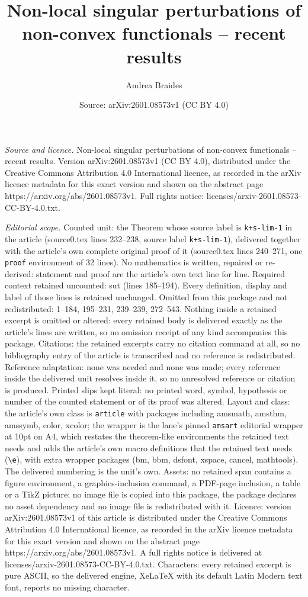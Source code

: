 \documentclass[10pt,a4paper]{amsart}
\title[Non-local singular perturbations of non-convex functionals -]{Non-local singular perturbations of non-convex functionals -- recent results}
\author{Andrea Braides}
\date{Source: arXiv:2601.08573v1 (CC BY 4.0)}
\begin{document}
\maketitle

\noindent\emph{Source and licence.} Non-local singular perturbations of non-convex functionals -- recent results. Version arXiv:2601.08573v1 (CC BY 4.0), distributed under the Creative Commons Attribution 4.0 International licence, as recorded in the arXiv licence metadata for this exact version and shown on the abstract page https://arxiv.org/abs/2601.08573v1. Full rights notice: licenses/arxiv-2601.08573-CC-BY-4.0.txt.\par\smallskip

\noindent\textit{Editorial scope.} Counted unit: the Theorem whose source label is \texttt{k+s-lim-1} in the article (source0.tex lines 232--238, source label \texttt{k+s-lim-1}), delivered together with the article's own complete original proof of it (source0.tex lines 240--271, one \texttt{proof} environment of 32 lines). No mathematics is written, repaired or re-derived: statement and proof are the article's own text line for line. Required context retained uncounted: sut (lines 185--194). Every definition, display and label of those lines is retained unchanged. Omitted from this package and not redistributed: 1--184, 195--231, 239--239, 272--543. Nothing inside a retained excerpt is omitted or altered: every retained body is delivered exactly as the article's lines are written, so no omission receipt of any kind accompanies this package. Citations: the retained excerpts carry no citation command at all, so no bibliography entry of the article is transcribed and no reference is redistributed. Reference adaptation: none was needed and none was made; every reference inside the delivered unit resolves inside it, so no unresolved reference or citation is produced. Printed slips kept literal: no printed word, symbol, hypothesis or number of the counted statement or of its proof was altered. Layout and class: the article's own class is \texttt{article} with packages including amsmath, amsthm, amssymb, color, xcolor; the wrapper is the lane's pinned \texttt{amsart} editorial wrapper at 10pt on A4, which restates the theorem-like environments the retained text needs and adds the article's own macro definitions that the retained text needs (\texttt{\textbackslash e}), with extra wrapper packages (bm, bbm, dsfont, xspace, cancel, mathtools). The delivered numbering is the unit's own. Assets: no retained span contains a figure environment, a graphics-inclusion command, a PDF-page inclusion, a table or a TikZ picture; no image file is copied into this package, the package declares no asset dependency and no image file is redistributed with it. Licence: version arXiv:2601.08573v1 of this article is distributed under the Creative Commons Attribution 4.0 International licence, as recorded in the arXiv licence metadata for this exact version and shown on the abstract page https://arxiv.org/abs/2601.08573v1. A full rights notice is delivered at licenses/arxiv-2601.08573-CC-BY-4.0.txt. Characters: every retained excerpt is pure ASCII, so the delivered engine, XeLaTeX with its default Latin Modern text font, reports no missing character.
\end{document}
